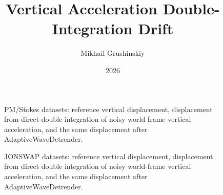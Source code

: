 \documentclass[11pt,letterpaper]{article}
\title{Vertical Acceleration Double-Integration Drift}
\author{Mikhail Grushinskiy}
\date{2026}
\begin{document}
\maketitle


\begin{figure}[H]\centering
\resizebox{\textwidth}{!}{}
\caption{PM/Stokes datasets: reference vertical displacement, displacement from direct double integration of noisy world-frame vertical acceleration, and the same displacement after AdaptiveWaveDetrender.}
\label{fig:pmstokes_vertical_accel_drift}
\end{figure}

\begin{figure}[H]\centering
\resizebox{\textwidth}{!}{}
\caption{JONSWAP datasets: reference vertical displacement, displacement from direct double integration of noisy world-frame vertical acceleration, and the same displacement after AdaptiveWaveDetrender.}
\label{fig:jonswap_vertical_accel_drift}
\end{figure}
\end{document}
